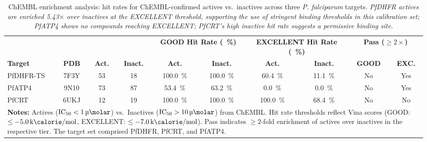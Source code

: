 \documentclass[journal=jcisd8,manuscript=suppinfo]{achemso}
\begin{document}
\begin{table}[!htbp]
\centering
\caption{ChEMBL enrichment analysis: hit rates for ChEMBL-confirmed actives vs.\ inactives across three \emph{P. falciparum} targets. \textit{PfDHFR actives are enriched 5.43$\times$ over inactives at the EXCELLENT threshold, supporting the use of stringent binding thresholds in this calibration set; PfATP4 shows no compounds reaching EXCELLENT; PfCRT's high inactive hit rate suggests a permissive binding site.}}
\label{tab:sm_s18b_chembl_enrichment}
\scriptsize
\begin{tabular}{lccccccccc}
\toprule
& & & & \multicolumn{2}{c|}{\textbf{GOOD Hit Rate (\qty{}{\percent})}} & \multicolumn{2}{c|}{\textbf{EXCELLENT Hit Rate (\qty{}{\percent})}} & \multicolumn{2}{c}{\textbf{Pass ($\geq \num{2}\times$)}} \\
\textbf{Target} & \textbf{PDB} & \textbf{Act.} & \textbf{Inact.} & \textbf{Act.} & \textbf{Inact.} & \textbf{Act.} & \textbf{Inact.} & \textbf{GOOD} & \textbf{EXC.} \\
\midrule
PfDHFR-TS & 7F3Y & \num{53} & \num{18} & \qty{100.0}{\percent} & \qty{100.0}{\percent} & \qty{60.4}{\percent} & \qty{11.1}{\percent} & No & Yes \\
PfATP4 & 9N10 & \num{73} & \num{87} & \qty{53.4}{\percent} & \qty{63.2}{\percent} & \qty{0.0}{\percent} & \qty{0.0}{\percent} & No & Yes \\
PfCRT & 6UKJ & \num{12} & \num{19} & \qty{100.0}{\percent} & \qty{100.0}{\percent} & \qty{100.0}{\percent} & \qty{68.4}{\percent} & No & No \\
\bottomrule
\multicolumn{10}{p{16cm}}{
\noindent\textbf{Notes:} Actives ($\text{IC}_{\num{50}} < \qty{1}{\micro\molar}$) vs.\ Inactives ($\text{IC}_{\num{50}} > \qty{10}{\micro\molar}$) from ChEMBL. Hit rate thresholds reflect Vina scores (GOOD: $\leq \qty{-5.0}{\kilo\calorie\per\mole}$, EXCELLENT: $\leq \qty{-7.0}{\kilo\calorie\per\mole}$). Pass indicates $\geq \num{2}$-fold enrichment of actives over inactives in the respective tier. The target set comprised PfDHFR, PfCRT, and PfATP4.}
\end{tabular}
\end{table}
\end{document}
